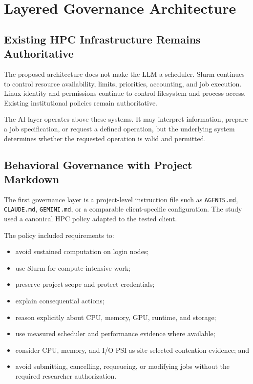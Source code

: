 \documentclass[11pt]{article}
\begin{document}
\section{Layered Governance Architecture}

\subsection{Existing HPC Infrastructure Remains Authoritative}

The proposed architecture does not make the LLM a scheduler. Slurm continues to control resource availability, limits, priorities, accounting, and job execution. Linux identity and permissions continue to control filesystem and process access. Existing institutional policies remain authoritative.

The AI layer operates above these systems. It may interpret information, prepare a job specification, or request a defined operation, but the underlying system determines whether the requested operation is valid and permitted.

\subsection{Behavioral Governance with Project Markdown}

The first governance layer is a project-level instruction file such as \texttt{AGENTS.md}, \texttt{CLAUDE.md}, \texttt{GEMINI.md}, or a comparable client-specific configuration. The study used a canonical HPC policy adapted to the tested client.

The policy included requirements to:
\begin{itemize}
    \item avoid sustained computation on login nodes;
    \item use Slurm for compute-intensive work;
    \item preserve project scope and protect credentials;
    \item explain consequential actions;
    \item reason explicitly about CPU, memory, GPU, runtime, and storage;
    \item use measured scheduler and performance evidence where available;
    \item consider CPU, memory, and I/O PSI as site-selected contention evidence; and
    \item avoid submitting, cancelling, requeueing, or modifying jobs without the required researcher authorization.
\end{itemize}
\end{document}
